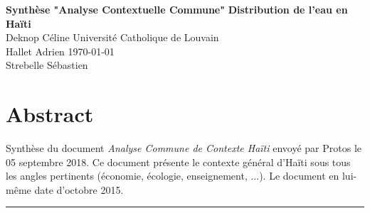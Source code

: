 \documentclass[a4paper, 11pt]{article}
\begin{document}
\noindent
\large\textbf{Synthèse "Analyse Contextuelle Commune"} \hfill \textbf{Distribution de l'eau en Haïti} \\
\normalsize Deknop Céline \hfill Université Catholique de Louvain \\
Hallet Adrien \hfill \today \\
Strebelle Sébastien

\section*{Abstract}
Synthèse du document \textit{Analyse Commune de Contexte Haïti} envoyé par Protos le 05 septembre 2018. Ce document présente le contexte général d'Haïti sous tous les angles pertinents (économie, écologie, enseignement, ...). Le document en lui-même date d'octobre 2015.
\hrule
\end{document}

